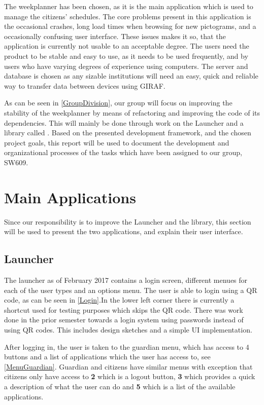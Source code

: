 The weekplanner has been chosen, as it is the main application which is used
to manage the citizens' schedules. The core problems present in this application is
the occasional crashes, long load times when browsing for new pictograms, and a
occasionally confusing user interface. These issues makes it so, that the
application is currently not usable to an acceptable degree. The users need the
product to be stable and easy to use, as it needs to be used frequently, and by
users who have varying degrees of experience using computers. The server
and database is chosen as any sizable institutions will need an easy, quick and
reliable way to transfer data between devices using GIRAF.\nl

As can be seen in \autoref{GroupDivision}, our group will focus on improving the
stability of the weekplanner by means of refactoring and improving the code of
its dependencies. This will mainly be done through work on the Launcher and a
library called . Based on the presented development
framework, and the chosen project goals, this report will be used to document
the development and organizational processes of the tasks which have been
assigned to our group, SW609.

\section{Main Applications}
Since our responsibility is to improve the Launcher and the
 library, this section will be used to present the
two applications, and explain their user interface.

\subsection{Launcher}\label{LauncherReview}
The launcher as of February 2017 contains a login screen, different menues for
each of the user types and an options menu. The user is able to login using a
QR code, as can be seen in \autoref{Login}.In the lower left corner there is
currently a shortcut used for testing purposes which skips the QR code. There
was work done in the prior semester towards a login system using passwords
instead of using QR codes. This includes design sketches and a simple UI
implementation.


After logging in, the user is taken to the guardian menu, which has access to 4
buttons and a list of applications which the user has access to,
see \autoref{MenuGuardian}. Guardian and citizens have similar menus with
exception that citizens only have access to \textbf{2} which is a logout button,
\textbf{3} which provides a quick a description of what the user can do and
\textbf{5} which is a list of the available applications.

